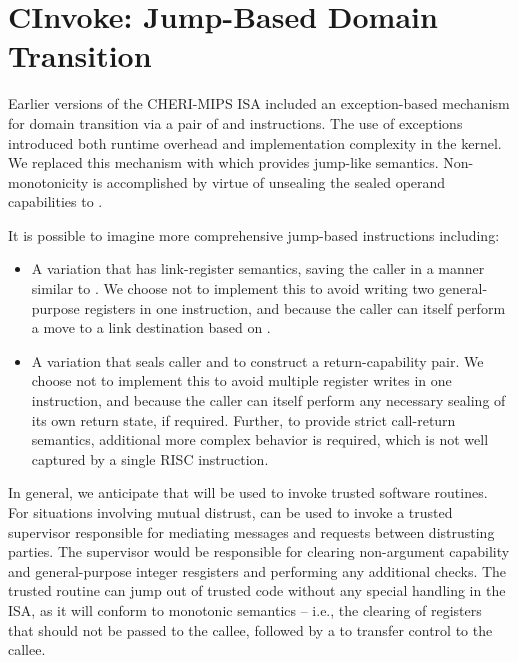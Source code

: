 \section{CInvoke: Jump-Based Domain Transition}
\label{sec:jump-based-domain-transition}

Earlier versions of the CHERI-MIPS ISA included an exception-based
mechanism for domain transition via a pair of 
and  instructions.  The use of exceptions
introduced both runtime overhead and implementation complexity in the
kernel.  We replaced this mechanism with 
which provides jump-like semantics.
Non-monotonicity is accomplished by virtue of unsealing the sealed
operand capabilities to .

It is possible to imagine more comprehensive jump-based instructions
including:
\begin{itemize}
\item A variation that has link-register semantics, saving the caller \PCC{}
  in a manner similar to .
  We choose not to implement this to avoid writing two general-purpose registers
  in one instruction, and because the
  caller can itself perform a move to a link destination based on
  .

\item A variation that seals caller \PCC{} and \IDC{} to construct a
  return-capability pair.
  We choose not to implement this to avoid multiple register writes in one instruction,
  and because the
  caller can itself perform any necessary sealing of its own return state, if
  required.
  Further, to provide strict call-return semantics, additional more complex
  behavior is required, which is not well captured by a single RISC
  instruction.
\end{itemize}

In general, we anticipate that  will be used
to invoke trusted software routines.  For situations involving
mutual distrust,  can be used to invoke
a trusted supervisor responsible for mediating messages and
requests between distrusting parties.  The supervisor would be
responsible for clearing non-argument capability and general-purpose
integer resgisters and performing any additional checks.
The  trusted
routine can jump out of trusted code without
any special handling in the ISA, as it will conform to monotonic
semantics -- i.e., the clearing of registers that should not be passed to the
callee, followed by a  to transfer control to the callee.

